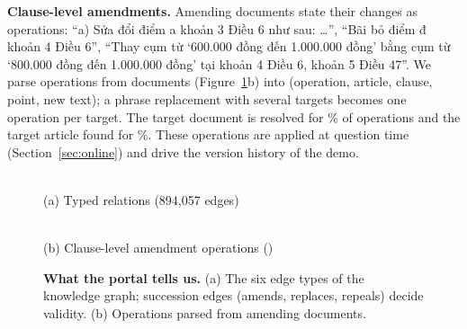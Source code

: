 \documentclass{article} %
\begin{document}
\textbf{Clause-level amendments.} Amending documents state their changes as operations: ``a) Sửa đổi điểm a khoản 3
Điều 6 như sau: \dots'', ``Bãi bỏ điểm đ khoản 4 Điều 6'', ``Thay cụm từ `600.000 đồng đến 1.000.000 đồng' bằng cụm từ
`800.000 đồng đến 1.000.000 đồng' tại khoản 4 Điều 6, khoản 5 Điều 47''. We parse \AmOps{} operations from \AmDocs{}
documents (Figure~\ref{fig:kg}b) into (operation, article, clause, point, new text); a phrase replacement with several
targets becomes one operation per target. The target document is resolved for \AmResolved\% of operations and the
target article found for \AmArtFound\%. These operations are applied at question time (Section~\ref{sec:online}) and
drive the version history of the demo.

\begin{figure}[t]
\centering
\begin{minipage}[t]{0.49\linewidth}\centering
{}\\
{\footnotesize (a) Typed relations (894,057 edges)}
\end{minipage}\hfill
\begin{minipage}[t]{0.49\linewidth}\centering
{}\\
{\footnotesize (b) Clause-level amendment operations (\AmOps)}
\end{minipage}
\caption{\textbf{What the portal tells us.} (a) The six edge types of the knowledge graph; succession edges (amends,
replaces, repeals) decide validity. (b) Operations parsed from amending documents.}
\label{fig:kg}
\end{figure}
\end{document}
